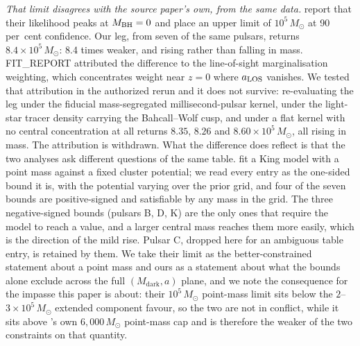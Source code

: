 \documentclass[11pt]{article}
\newcommand{\msun}{\ensuremath{M_\odot}}
\newcommand{\mdark}{\ensuremath{M_{\mathrm{dark}}}}
\begin{document}
\emph{That limit disagrees with the source paper's own, from the same data.} \citet{ColomiBernadich2026} report that their likelihood peaks at $M_{\rm BH} = 0$ and place an upper limit of $10^{5}\,\msun$ at 90\,per~cent confidence. Our leg, from seven of the same pulsars, returns $8.4\times10^{5}\,\msun$: 8.4 times weaker, and rising rather than falling in mass. FIT\_REPORT attributed the difference to the line-of-sight marginalisation weighting, which concentrates weight near $z = 0$ where $a_{\rm LOS}$ vanishes. We tested that attribution in the authorized rerun and it does not survive: re-evaluating the leg under the fiducial mass-segregated millisecond-pulsar kernel, under the light-star tracer density carrying the Bahcall--Wolf cusp, and under a flat kernel with no central concentration at all returns $8.35$, $8.26$ and $8.60\times10^{5}\,\msun$, all rising in mass. The attribution is withdrawn. What the difference does reflect is that the two analyses ask different questions of the same table. \citet{ColomiBernadich2026} fit a King model with a point mass against a fixed cluster potential; we read every entry as the one-sided bound it is, with the potential varying over the prior grid, and four of the seven bounds are positive-signed and satisfiable by any mass in the grid. The three negative-signed bounds (pulsars B, D, K) are the only ones that require the model to reach a value, and a larger central mass reaches them more easily, which is the direction of the mild rise. Pulsar C, dropped here for an ambiguous table entry, is retained by them. We take their limit as the better-constrained statement about a point mass and ours as a statement about what the bounds alone exclude across the full $(\mdark, a)$ plane, and we note the consequence for the impasse this paper is about: their $10^{5}\,\msun$ point-mass limit sits below the $2$--$3\times10^{5}\,\msun$ extended component \citet{BanaresHernandez2025} favour, so the two are not in conflict, while it sits above \citeauthor{BanaresHernandez2025}'s own $6{,}000\,\msun$ point-mass cap and is therefore the weaker of the two constraints on that quantity.
\end{document}
